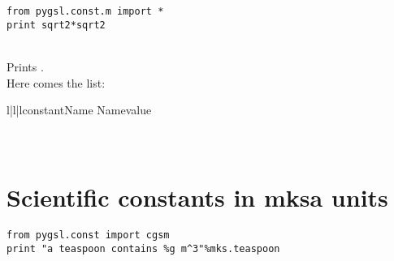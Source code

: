 \begin{verbatim}
from pygsl.const.m import *
print sqrt2*sqrt2
\end{verbatim}\\
Prints .\\
 Here comes the list:\nopagebreak
\begin{longtableiii}{l|l|l}{constant}{Name}{\gsl{} Name}{value}
\end{longtableiii}

\section[\protect\module{pygsl.const.mksa} --- Scientific constants in mksa units]
{\protect{} \\ Scientific constants in mksa units} 
\label{cha:const-mks-module}

\begin{verbatim}
from pygsl.const import cgsm
print "a teaspoon contains %g m^3"%mks.teaspoon
\end{verbatim}

